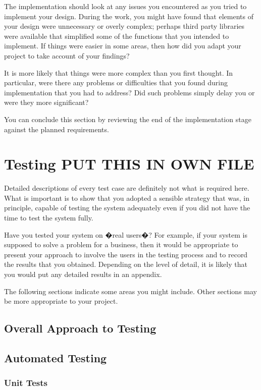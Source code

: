 The implementation should look at any issues you encountered as you tried to implement your design. During the work, you might have found that elements of your design were unnecessary or overly complex; perhaps third party libraries were available that simplified some of the functions that you intended to implement. If things were easier in some areas, then how did you adapt your project to take account of your findings?

It is more likely that things were more complex than you first thought. In particular, were there any problems or difficulties that you found during implementation that you had to address? Did such problems simply delay you or were they more significant? 

You can conclude this section by reviewing the end of the implementation stage against the planned requirements. 

\chapter{Testing PUT THIS IN OWN FILE}

Detailed descriptions of every test case are definitely not what is required here. What is important is to show that you adopted a sensible strategy that was, in principle, capable of testing the system adequately even if you did not have the time to test the system fully.

Have you tested your system on �real users�? For example, if your system is supposed to solve a problem for a business, then it would be appropriate to present your approach to involve the users in the testing process and to record the results that you obtained. Depending on the level of detail, it is likely that you would put any detailed results in an appendix.

The following sections indicate some areas you might include. Other sections may be more appropriate to your project. 

\section{Overall Approach to Testing}

\section{Automated Testing}

\subsection{Unit Tests}

